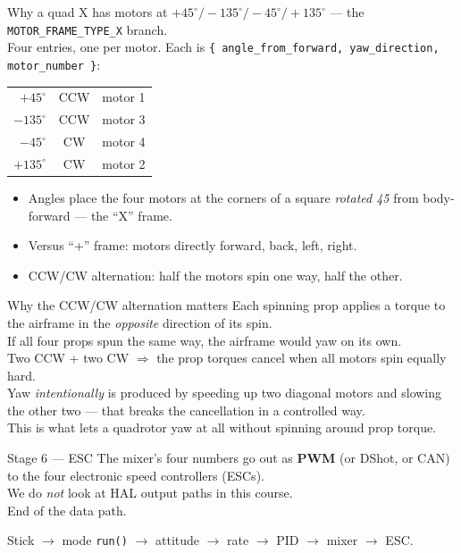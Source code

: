 \documentclass[aspectratio=169,11pt]{beamer}
\begin{document}
\begin{frame}{Why a quad X has motors at $+45^\circ / -135^\circ / -45^\circ / +135^\circ$}
   --- the \texttt{MOTOR\_FRAME\_TYPE\_X} branch.\\[1ex]
  Four entries, one per motor. Each is \texttt{\{ angle\_from\_forward, yaw\_direction, motor\_number \}}:
  \begin{center}\small
    \begin{tabular}{rcc}
      $+45^\circ$  & CCW & motor 1 \\
      $-135^\circ$ & CCW & motor 3 \\
      $-45^\circ$  & CW  & motor 4 \\
      $+135^\circ$ & CW  & motor 2 \\
    \end{tabular}
  \end{center}
  \begin{itemize}
    \item Angles place the four motors at the corners of a square \emph{rotated 45\textdegree} from body-forward --- the ``X'' frame.
    \item Versus ``+'' frame: motors directly forward, back, left, right.
    \item CCW/CW alternation: half the motors spin one way, half the other.
  \end{itemize}
\end{frame}

\begin{frame}{Why the CCW/CW alternation matters}
  Each spinning prop applies a torque to the airframe in the \emph{opposite} direction of its spin.\\[1ex]
  If all four props spun the same way, the airframe would yaw on its own.\\[1ex]
  Two CCW + two CW $\Rightarrow$ the prop torques cancel when all motors spin equally hard.\\[1ex]
  Yaw \emph{intentionally} is produced by speeding up two diagonal motors and slowing the other two --- that breaks the cancellation in a controlled way.\\[1ex]
  This is what lets a quadrotor yaw at all without spinning around prop torque.
\end{frame}

\begin{frame}{Stage 6 --- ESC}
  The mixer's four numbers go out as \textbf{PWM} (or DShot, or CAN) to the four electronic speed controllers (ESCs).\\[1ex]
  We do \emph{not} look at HAL output paths in this course.\\[1ex]
  End of the data path.
  \vfill
  \begin{center}
    Stick $\rightarrow$ mode \texttt{run()} $\rightarrow$ attitude $\rightarrow$ rate $\rightarrow$ PID $\rightarrow$ mixer $\rightarrow$ ESC.
  \end{center}
\end{frame}
\end{document}
